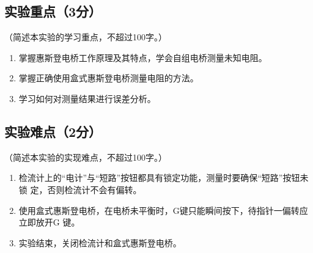 \documentclass{../../templates/Report}%
\begin{document}
\subsection{实验重点（3分）}
（简述本实验的学习重点，不超过100字。）
\begin{enumerate}
    \item 掌握惠斯登电桥工作原理及其特点，学会自组电桥测量未知电阻。
    \item 掌握正确使用盒式惠斯登电桥测量电阻的方法。
    \item 学习如何对测量结果进行误差分析。
\end{enumerate}
\subsection{实验难点（2分）}
（简述本实验的实现难点，不超过100字。）
\begin{enumerate}
    \item  检流计上的“电计”与“短路”按钮都具有锁定功能，测量时要确保“短路”按钮未锁
    定，否则检流计不会有偏转。
    \item 使用盒式惠斯登电桥，在电桥未平衡时，G键只能瞬间按下，待指针一偏转应立即放开G
    键。
    \item 实验结束，关闭检流计和盒式惠斯登电桥。
\end{enumerate}
\end{document}

